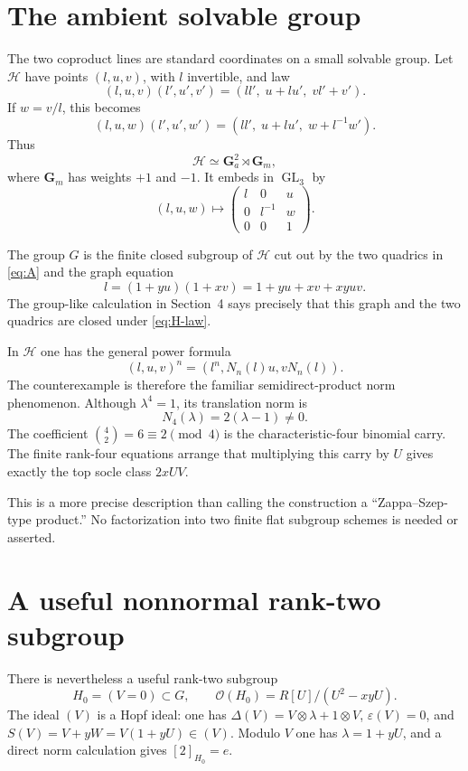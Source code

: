 \documentclass[11pt]{article}
\theoremstyle{remark}
\newcommand{\Gm}{\mathbf G_m}
\newcommand{\Ga}{\mathbf G_a}
\newcommand{\eps}{\varepsilon}
\newcommand{\ot}{\otimes}
\begin{document}
\section{The ambient solvable group}

The two coproduct lines are standard coordinates on a small solvable group.
Let $\mathcal H$ have points $(l,u,v)$, with $l$ invertible, and law
\begin{equation}\label{eq:H-law}
 (l,u,v)(l',u',v')
  =(ll',\;u+lu',\;vl'+v').
\end{equation}
If $w=v/l$, this becomes
\[
 (l,u,w)(l',u',w')
  =(ll',\;u+lu',\;w+l^{-1}w').
\]
Thus
\[
 \mathcal H\simeq\Ga^2\rtimes\Gm,
\]
where $\Gm$ has weights $+1$ and $-1$.  It embeds in $\operatorname{GL}_3$
by
\[
 (l,u,w)\longmapsto
 \begin{pmatrix}
 l&0&u\\
 0&l^{-1}&w\\
 0&0&1
 \end{pmatrix}.
\]

The group $G$ is the finite closed subgroup of $\mathcal H$ cut out by the
two quadrics in \eqref{eq:A} and the graph equation
\begin{equation}\label{eq:graph}
 l=(1+yu)(1+xv)=1+yu+xv+xyuv.
\end{equation}
The group-like calculation in Section~4 says precisely that this graph and
the two quadrics are closed under \eqref{eq:H-law}.

In $\mathcal H$ one has the general power formula
\[
 (l,u,v)^n=(l^n,N_n(l)u,vN_n(l)).
\]
The counterexample is therefore the familiar semidirect-product norm
phenomenon.  Although $\lambda^4=1$, its translation norm is
\[
 N_4(\lambda)=2(\lambda-1)\ne0.
\]
The coefficient $\binom42=6\equiv2\pmod4$ is the characteristic-four
binomial carry.  The finite rank-four equations arrange that multiplying
this carry by $U$ gives exactly the top socle class $2xUV$.

This is a more precise description than calling the construction a
``Zappa--Szep-type product.''  No factorization into two finite flat subgroup
schemes is needed or asserted.

\section{A useful nonnormal rank-two subgroup}

There is nevertheless a useful rank-two subgroup
\[
 H_0=(V=0)\subset G,
 \qquad
 \mathcal O(H_0)=R[U]/(U^2-xyU).
\]
The ideal $(V)$ is a Hopf ideal: one has
$\Delta(V)=V\ot\lambda+1\ot V$, $\eps(V)=0$, and
$S(V)=V+yW=V(1+yU)\in(V)$.  Modulo $V$ one has
$\lambda=1+yU$, and a direct norm calculation gives $[2]_{H_0}=e$.
\end{document}
